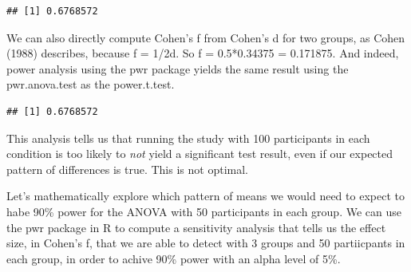 \documentclass[]{book}
\newenvironment{Shaded}{\begin{snugshade}}{\end{snugshade}}
\newcommand{\DataTypeTok}[1]{\textcolor[rgb]{0.13,0.29,0.53}{#1}}
\newcommand{\DecValTok}[1]{\textcolor[rgb]{0.00,0.00,0.81}{#1}}
\newcommand{\FloatTok}[1]{\textcolor[rgb]{0.00,0.00,0.81}{#1}}
\newcommand{\KeywordTok}[1]{\textcolor[rgb]{0.13,0.29,0.53}{\textbf{#1}}}
\newcommand{\NormalTok}[1]{#1}
\newcommand{\OperatorTok}[1]{\textcolor[rgb]{0.81,0.36,0.00}{\textbf{#1}}}
\newcommand{\StringTok}[1]{\textcolor[rgb]{0.31,0.60,0.02}{#1}}
\begin{document}
\begin{Shaded}
\end{Shaded}

\begin{verbatim}
## [1] 0.6768572
\end{verbatim}

We can also directly compute Cohen's f from Cohen's d for two groups, as Cohen (1988) describes, because f = 1/2d. So f = 0.5*0.34375 = 0.171875. And indeed, power analysis using the pwr package yields the same result using the pwr.anova.test as the power.t.test.

\begin{Shaded}
\end{Shaded}

\begin{verbatim}
## [1] 0.6768572
\end{verbatim}

This analysis tells us that running the study with 100 participants in each condition is too likely to \emph{not} yield a significant test result, even if our expected pattern of differences is true. This is not optimal.

Let's mathematically explore which pattern of means we would need to expect to habe 90\% power for the ANOVA with 50 participants in each group. We can use the pwr package in R to compute a sensitivity analysis that tells us the effect size, in Cohen's f, that we are able to detect with 3 groups and 50 partiicpants in each group, in order to achive 90\% power with an alpha level of 5\%.
\end{document}
